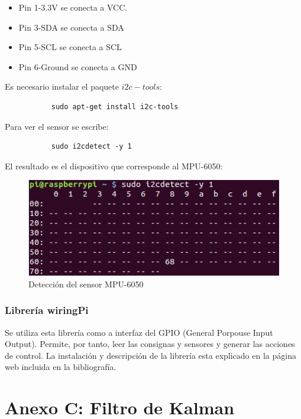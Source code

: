 \documentclass[twoside,11pt]{book}
\begin{document}
\begin{itemize}
\item Pin 1-3.3V se conecta a VCC.
\item Pin 3-SDA se conecta a SDA
\item Pin 5-SCL se conecta a SCL
\item Pin 6-Ground se conecta a GND
\end{itemize} 
Es necesario instalar el paquete $i2c-tools$:
\begin{verbatim}
           sudo apt-get install i2c-tools
\end{verbatim}
Para ver el sensor se escribe:
\begin{verbatim}
           sudo i2cdetect -y 1
\end{verbatim}
El resultado es el dispositivo que corresponde al MPU-6050:

\begin{figure}[h!]
\begin{center}
\includegraphics[scale=0.7,bb=0 0 350 178]{images/i2cdetect.png}
\caption{Detección del sensor MPU-6050}
\end{center}
\end{figure}


\subsubsection*{Librería wiringPi}
Se utiliza esta librería \cite{wiringPi} como a interfaz del GPIO (General Porpouse Input Output). Permite, por tanto, leer las consignas y sensores y generar las acciones de control. 
La instalación y descripción de la librería esta explicado en la página web incluida en la bibliografía.

\newpage
\section*{Anexo C: Filtro de Kalman}
\end{document}
